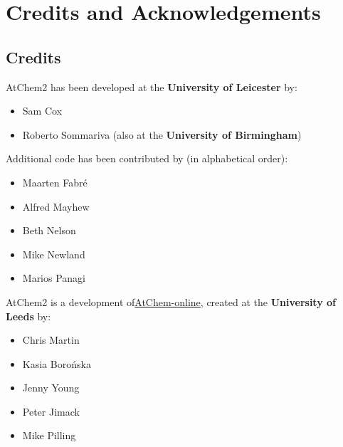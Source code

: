 %
%
%
%

\chapter{Credits and Acknowledgements} \label{ch:credits}

\section{Credits} \label{sec:credits}

AtChem2 has been developed at the \textbf{University of Leicester} by:

\begin{itemize}
\item Sam Cox
\item Roberto Sommariva (also at the \textbf{University of Birmingham})
\end{itemize}

Additional code has been contributed by (in alphabetical order):

\begin{itemize}
\item Maarten Fabr{\'e}
\item Alfred Mayhew
\item Beth Nelson
\item Mike Newland
\item Marios Panagi
\end{itemize}

AtChem2 is a development of\href{https://atchem.leeds.ac.uk/webapp/}{AtChem-online},
created at the \textbf{University of Leeds} by:

\begin{itemize}
\item Chris Martin
\item Kasia Boro{\'n}ska
\item Jenny Young
\item Peter Jimack
\item Mike Pilling
\end{itemize}

